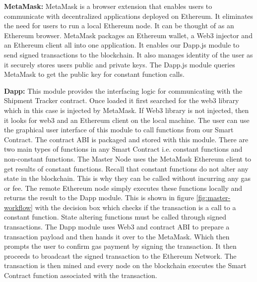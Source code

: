 \textbf{MetaMask:}
MetaMask is a browser extension that enables users to communicate with decentralized applications deployed on Ethereum. It eliminates the need for users to run a local Ethereum node. It can be thought of as an Ethereum browser. MetaMask packages an Ethereum wallet, a Web3 injector and an Ethereum client all into one application. It enables our Dapp.js module to send signed transactions to the blockchain. It also manages identity of the user as it securely stores users public and private keys. The Dapp.js module queries MetaMask to get the public key for constant function calls.

\textbf{Dapp:}
This module provides the interfacing logic for communicating with the Shipment Tracker contract. Once loaded it first searched for the web3 library which in this case is injected by MetaMask. If Web3 library is not injected, then it looks for web3 and an Ethereum client on the local machine. The user can use the graphical user interface of this module to call functions from our Smart Contract. The contract ABI is packaged and stored with this module. There are two main types of functions in any Smart Contract i.e. constant functions and non-constant functions. The Master Node uses the MetaMask Ethereum client to get results of constant functions. Recall that constant functions do not alter any state in the blockchain. This is why they can be called without incurring any gas or fee. The remote Ethereum node simply executes these functions locally and returns the result to the Dapp module. This is shown in figure \ref{fig:master-workflow} with the decision box which checks if the transaction is a call to a constant function. State altering functions must be called through signed transactions. The Dapp module uses Web3 and contract ABI to prepare a transaction payload and then hands it over to the MetaMask. Which then prompts the user to confirm gas payment by signing the transaction. It then proceeds to broadcast the signed transaction to the Ethereum Network. The transaction is then mined and every node on the blockchain executes the Smart Contract function associated with the transaction.

